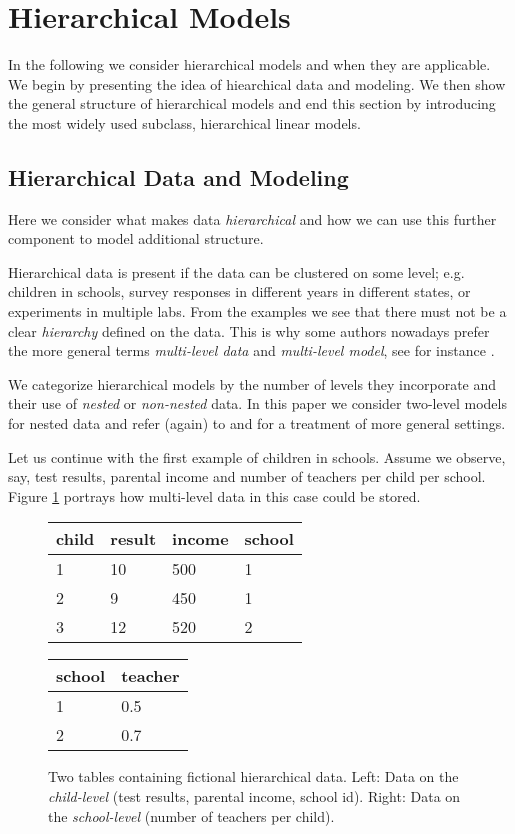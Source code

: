 \setlength{\abovedisplayskip}{2pt}
\setlength{\belowdisplayskip}{2pt}
\section{Hierarchical Models}
\label{sec:hierachical_modeling}
In the following we consider hierarchical models and when they are applicable.
We begin by presenting the idea of hiearchical data and modeling.
We then show the general structure of hierarchical models and end this section by introducing the most widely used subclass, hierarchical linear models.

\subsection{Hierarchical Data and Modeling}
Here we consider what makes data \emph{hierarchical} and how we can use this further component to model additional structure.

Hierarchical data is present if the data can be clustered on some level; e.g. children in schools, survey responses in different years in different states, or experiments in multiple labs.
From the examples we see that there must not be a clear \emph{hierarchy} defined on the data.
This is why some authors nowadays prefer the more general terms \emph{multi-level data} and \emph{multi-level model}, see for instance \citet{GelmanHill2007}.

We categorize hierarchical models by the number of levels they incorporate and their use of \emph{nested} or \emph{non-nested} data.
In this paper we consider two-level models for nested data and refer (again) to \citet{GelmanHill2007} and \citet{snijders1999} for a treatment of more general settings.

Let us continue with the first example of children in schools.
Assume we observe, say, test results, parental income and number of teachers per child per school.
Figure \ref{fig:relational_table} portrays how multi-level data in this case could be stored.
\begin{figure}[!ht]
\begin{center}
\begin{tabular}{l l l l}
child & result & income & school\\
\hline
1 & 10 & 500 & 1\\
2 & 9 & 450 & 1\\
3 & 12 & 520 & 2
\end{tabular}
\quad
\begin{tabular}{l l}
school & teacher\\
\hline
1 & 0.5\\
2 & 0.7
\end{tabular}
\end{center}
\caption{Two tables containing fictional hierarchical data. Left: Data on the \emph{child-level} (test results, parental income, school id). Right: Data on the \emph{school-level} (number of teachers per child).}
\label{fig:relational_table}
\end{figure}

